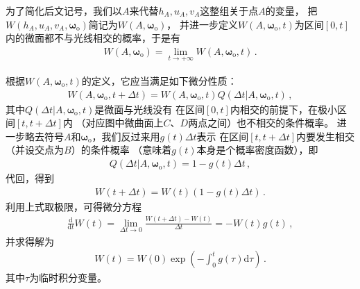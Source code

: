 为了简化后文记号，我们以$A$来代替$h_A,u_A,v_A$这整组关于点$A$的变量，
把$W(h_A,u_A,v_A,{\bm\omega}_{\mathrm{o}})$简记为$W(A,{\bm\omega}_{\mathrm{o}})$，
并进一步定义$W(A,{\bm\omega}_{\mathrm{o}},t)$为区间$[0,t]$内的微面都不与光线相交的概率，于是有
\begin{align}\label{eq:08ex01-W-definition}
    W(A,{\bm\omega}_{\mathrm{o}})=\lim\limits_{t\to +\infty}W(A,{\bm\omega}_{\mathrm{o}},t)\, .
\end{align}

根据$W(A,{\bm\omega}_{\mathrm{o}},t)$的定义，它应当满足如下微分性质：
\begin{align}\label{eq:08ex01-VisiblePointProbability}
    W(A,{\bm\omega}_{\mathrm{o}},t+\Delta t)
    =W(A,{\bm\omega}_{\mathrm{o}},t)
    Q(\Delta t|A,{\bm\omega}_{\mathrm{o}},t)\, ,
\end{align}
其中$Q(\Delta t|A,{\bm\omega}_{\mathrm{o}},t)$是微面与光线没有
在区间$[0,t]$内相交的前提下，在极小区间$[t,t+\Delta t]$内
（对应图中微曲面上$C$、$D$两点之间）也不相交的条件概率。
进一步略去符号$A$和${\bm\omega}_{\mathrm{o}}$，我们反过来用$g(t)\Delta t$表示
在区间$[t,t+\Delta t]$内要发生相交（并设交点为$B$）的条件概率
（意味着$g(t)$本身是个概率密度函数），即
\begin{align}
    Q(\Delta t|A,{\bm\omega}_{\mathrm{o}},t)=1-g(t)\Delta t\, ,
\end{align}
代回，得到
\begin{align}
    W(t+\Delta t)=W(t)(1-g(t)\Delta t)\, .
\end{align}
利用上式取极限，可得微分方程
\begin{align}
    \frac{\mathrm{d}}{\mathrm{d}t}W(t)=\lim\limits_{\Delta t\to 0}\frac{W(t+\Delta t)-W(t)}{\Delta t}=-W(t)g(t)\, ,
\end{align}
并求得解为
\begin{align}\label{eq:08ex01-WtSolution}
    W(t)=W(0)\exp\left(-\int_{0}^{t}g(\tau)\mathrm{d}\tau\right)\, .
\end{align}
其中$\tau$为临时积分变量。


